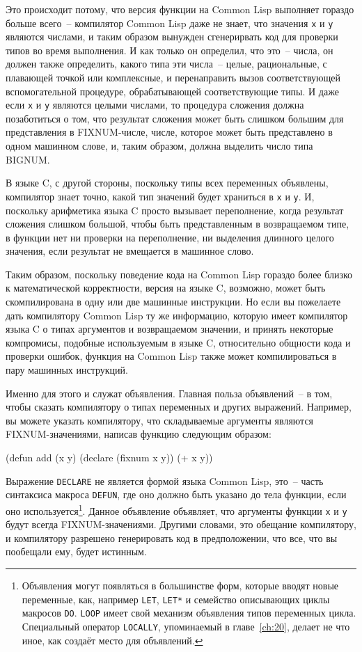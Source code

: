 Это происходит потому, что версия функции на Common Lisp выполняет гораздо больше
всего~-- компилятор Common Lisp даже не знает, что значения \lstinline{x} и \lstinline{y} являются
числами, и таким образом вынужден сгенерирвать код для проверки типов во время выполнения.
И как только он определил, что это~-- числа, он должен также определить, какого типа эти
числа~-- целые, рациональные, с плавающей точкой или комплексные, и перенаправить вызов
соответствующей вспомогательной процедуре, обрабатывающей соответствующие типы. И даже
если \lstinline{x} и \lstinline{y} являются целыми числами, то процедура сложения должна
позаботиться о том, что результат сложения может быть слишком большим для представления в
FIXNUM-числе, числе, которое может быть представлено в одном машинном слове, и, таким
образом, должна выделить число типа BIGNUM.

В языке C, с другой стороны, поскольку типы всех переменных объявлены, компилятор знает
точно, какой тип значений будет храниться в \lstinline{x} и \lstinline{y}. И, поскольку арифметика
языка C просто вызывает переполнение, когда результат сложения слишком большой, чтобы быть
представленным в возвращаемом типе, в функции нет ни проверки на переполнение, ни
выделения длинного целого значения, если результат не вмещается в машинное слово.

Таким образом, поскольку поведение кода на Common Lisp гораздо более близко к
математической корректности, версия на языке C, возможно, может быть скомпилирована в одну
или две машинные инструкции. Но если вы пожелаете дать компилятору Common Lisp ту же
информацию, которую имеет компилятор языка C о типах аргументов и возвращаемом значении, и
принять некоторые компромисы, подобные используемым в языке C, относительно общности кода
и проверки ошибок, функция на Common Lisp также может компилироваться в пару машинных
инструкций.

Именно для этого и служат объявления. Главная польза объявлений~-- в том, чтобы сказать
компилятору о типах переменных и других выражений. Например, вы можете указать
компилятору, что складываемые аргументы являются FIXNUM-значениями, написав функцию
следующим образом:

\begin{myverb}
(defun add (x y)
  (declare (fixnum x y))
  (+ x y))
\end{myverb}

Выражение \lstinline{DECLARE} не является формой языка Common Lisp, это~-- часть
синтаксиса макроса \lstinline{DEFUN}, где оно должно быть указано до тела функции, если
оно используется\footnote{Объявления могут появляться в большинстве форм, которые вводят
  новые переменные, как, например \lstinline{LET}, \lstinline{LET*} и семейство
  описывающих циклы макросов \lstinline{DO}. \lstinline{LOOP} имеет свой механизм
  объявления типов переменных цикла. Специальный оператор \lstinline{LOCALLY}, упоминаемый
  в главе~\ref{ch:20}, делает не что иное, как создаёт место для объявлений.}. Данное
объявление объявляет, что аргументы функции \lstinline{x} и \lstinline{y} будут всегда
FIXNUM-значениями. Другими словами, это обещание компилятору, и компилятору разрешено
генерировать код в предположении, что все, что вы пообещали ему, будет истинным.

